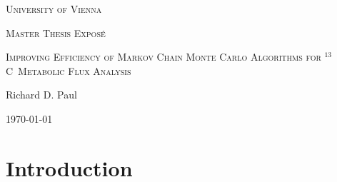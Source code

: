\documentclass[10pt]{article}
\newcommand{\Ciso}{$^{13}$C~}
\newcommand{\todo}[1]{{\color{red}#1}}
\newcommand{\mytitle}{\textsc{Improving Efficiency of Markov \\ Chain Monte Carlo Algorithms for \Ciso Metabolic Flux Analysis}}
\newcommand{\mysubtitle}{\textsc{Master Thesis Expos\'e}}
\begin{document}
    \begin{titlepage}
	\centering
	\phantom{hello}
	\vspace{2cm}
	{\scshape\Large University of Vienna\par}
	\vspace{0.1cm}
	{\scshape\LARGE Master Thesis Expos\'e \par}
	\vspace{1cm}
	{\scshape\huge Improving Efficiency of Markov Chain Monte Carlo Algorithms for \Ciso Metabolic Flux Analysis \par}
	\vspace{1.5cm}
	{\Large Richard D. Paul\par}
	\vspace{0.2cm}
	{\today\par}
	\vspace{2cm}
	\begin{abstract}
	    \noindent \lipsum[1-2]
	\end{abstract}
	\vfill
    \end{titlepage}
%
%
%

\pagebreak

\section{Introduction}
\label{sec:introduction}
\end{document}
